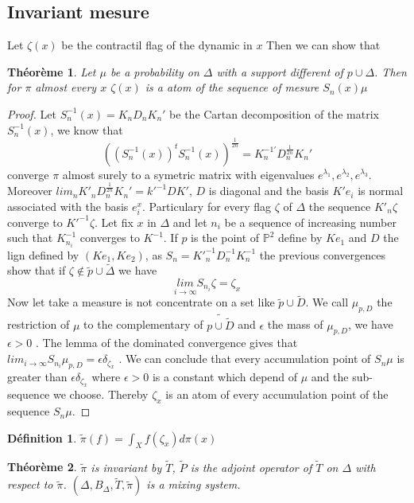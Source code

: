 \documentclass[12pt]{article}
\theoremstyle{plain}%
\newtheorem{thm}{Théorème}[section]
\theoremstyle{definition}
\newtheorem{dfnt}{Définition}[section]
\theoremstyle{remark}
\begin{document}
\subsection{Invariant mesure}
Let $\zeta(x)$ be the contractil flag of the dynamic in $x$\newline
Then we can show that
\begin{thm}
\tabto{2cm} Let $\mu$ be a probability on $\Delta$ with a support different of $p \cup \Delta$. Then for $\pi$ almost every $x$ $\zeta(x)$ is a atom of the sequence of mesure $S_n(x)\mu$
\end{thm}
\begin{proof}
Let $S_n^{-1}(x)=K_n D_n K_n'$ be the Cartan decomposition of the matrix $S_n^{-1}(x)$, we know that \[
((S_n^{-1}(x))^{t}
 S_n^{-1}(x))^{\frac{1}{2n}} =
 K_n^{-1'}
 D_n^{\frac{1}{2n}}
 K_n'
\]
\tabto{2cm} converge $\pi$ almost surely to a symetric matrix with eigenvalues $e^{\lambda_1},e^{\lambda_2},e^{\lambda_3}$. Moreover $lim_n K'_n D_n^{\frac{1}{2n}} K_n'=k'^{-1}D K'$, $D$ is diagonal and the basis $K' e_i$ is normal associated with the basis $e_i^{x}$. \newline
Particulary for every flag $\zeta$ of $\Delta$ the sequence $K'_n \zeta$ converge to $K'^{-1} \zeta$.
 \tabto{2cm} Let fix $x$ in $\Delta$ and let $n_i$ be a sequence of increasing number such that $K^{-1}_{n_i}$ converges to $K^{-1}$.
If $p$ is the point of $\mathbb{P}^2$ define by $K e_1$
 and $D$ the lign defined by $(K e_1, K e_2)$, as $S_n= K'^{-1}_n D_n^{-1} K_n^{-1}$ the previous convergences show that if $\zeta \notin \tilde{p} \cup \tilde{\Delta}$ we have \[
\underset{i \to \infty}{lim} S_{n_i} \zeta =\zeta_x
\]
\tabto{2cm} Now let take a measure is not concentrate on a set like $\tilde{p} \cup \tilde{D}$. We call $\mu_{p,D}$ the restriction of $\mu$ to the complementary of $\tilde{p \cup \tilde{D}}$ and $\epsilon$ the mass of $\mu_{p,D}$, we have $\epsilon > 0$ . The lemma of the dominated convergence gives that $lim_{i \to \infty} S_{n_i} \mu_{p,D} = \epsilon \delta_{\zeta_x}$ .
We can conclude that every accumulation point of $S_n \mu$ is greater than $\epsilon \delta_{\zeta_x}$ where $\epsilon > 0$
is a constant which depend of $\mu$ and the sub-sequence we choose. Thereby $\zeta_x$ is an atom of every accumulation point of the sequence $S_n \mu$.
\end{proof}
\begin{dfnt}
$\tilde{\pi}(f)=\int_X f(\zeta_x) d \pi(x)$
\end{dfnt}

\begin{thm}
$\tilde{\pi}$ is invariant by $\tilde{T}$, $\tilde{P}$ is the adjoint operator of $\tilde{T}$ on $\Delta$ with respect to $\tilde{\pi}$. $(\Delta,B_\Delta,\tilde{T},\tilde{\pi})$ is a mixing system.
\end{thm}
\end{document}
